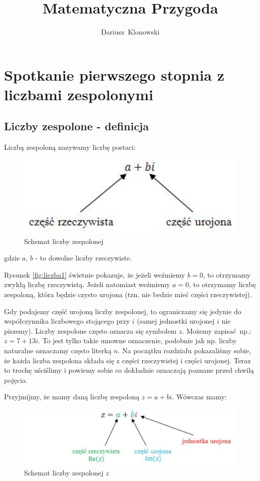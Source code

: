 \documentclass[a4paper,12pt]{article}
\author{Dariusz~Klonowski}  %
\title{Matematyczna Przygoda}
\begin{document}
\maketitle
\tableofcontents
\newpage
\section{Spotkanie pierwszego stopnia z liczbami zespolonymi}
\label{sec:SpotkaniePierwszegoStopniaZLiczbamiZespolonymi}
\subsection{Liczby zespolone - definicja}
\label{subsec:LiczbyZespoloneDefinicja}

Liczbą zespoloną nazywamy liczbę postaci:
\begin{figure}[h]
\centering
\includegraphics[scale=0.5]{liczba_zespolona.pdf}
\caption{Schemat liczby zespolonej}
\label{fig:liczba1}
\end{figure}

gdzie $a$, $b$ - to dowolne liczby rzeczywiste.

Rysunek \eqref{fig:liczba1} świetnie pokazuje, że jeżeli weźmiemy $b=0$, to otrzymamy zwykłą liczbę rzeczywistą.
Jeżeli natomiast weźmiemy $a=0$, to otrzymamy liczbę zespoloną, która będzie czysto urojona (tzn. nie bedzie mieć części rzeczywistej).

Gdy podajemy część urojoną liczby zespolonej, to ograniczamy się jedynie do współczynnika liczbowego stojącego przy
$i$ (samej jednostki urojonej $i$ nie piszemy).
Liczby zespolone często oznacza się symbolem $z$. Możemy zapisać~np.: $z=7+13i$.
To jest tylko takie umowne oznaczenie, podobnie jak np. liczby naturalne oznaczamy często literką $n$.
Na początku rozdziału pokazaliśmy sobie, że każda liczba zespolona składa się z części rzeczywistej i części urojonej. Teraz to trochę uściślimy i powiemy sobie co dokładnie oznaczają poznane przed chwilą pojęcia.

Przyjmijmy, że mamy daną liczbę zespoloną $z=a+bi$. Wówczas mamy:
\begin{figure}[h]
\centering
\includegraphics[scale=0.4]{liczba_zespolona2.pdf}
\caption{Schemat liczby zespolonej $z$}
\label{fig:liczba2}
\end{figure}
\end{document}
